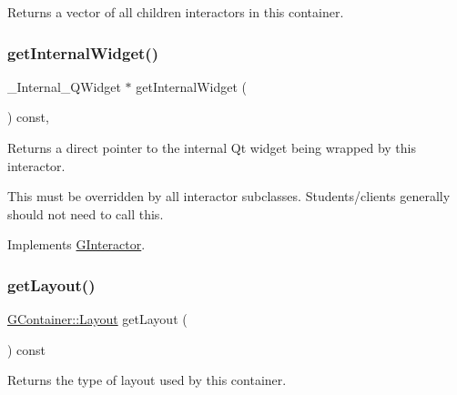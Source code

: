 Returns a vector of all children interactors in this container. 

\mbox{\label{classsgl_1_1GContainer_a2f6b36b2517087dc90a366b5ce1f5323}} 
\subsubsection{\texorpdfstring{get\+Internal\+Widget()}{getInternalWidget()}}
{\footnotesize\ttfamily \+\_\+\+Internal\+\_\+\+Q\+Widget $\ast$ get\+Internal\+Widget (\begin{DoxyParamCaption}{ }\end{DoxyParamCaption}) const\hspace{0.3cm}{\ttfamily [override]}, {\ttfamily [virtual]}}



Returns a direct pointer to the internal Qt widget being wrapped by this interactor. 

This must be overridden by all interactor subclasses. Students/clients generally should not need to call this. 

Implements \mbox{\hyperlink{classsgl_1_1GInteractor}{G\+Interactor}}.

\mbox{\label{classsgl_1_1GContainer_aeebcf77b7fdc91a1ba0371cc9b91d5e2}} 
\subsubsection{\texorpdfstring{get\+Layout()}{getLayout()}}
{\footnotesize\ttfamily \mbox{\hyperlink{classsgl_1_1GContainer_a1b7da28ed84c0763e8f92cde2df4799b}{G\+Container\+::\+Layout}} get\+Layout (\begin{DoxyParamCaption}{ }\end{DoxyParamCaption}) const\hspace{0.3cm}{\ttfamily [virtual]}}



Returns the type of layout used by this container. 

\mbox{\label{classsgl_1_1GInteractor_a4f83802015511edeb63b892830812c11}} 
